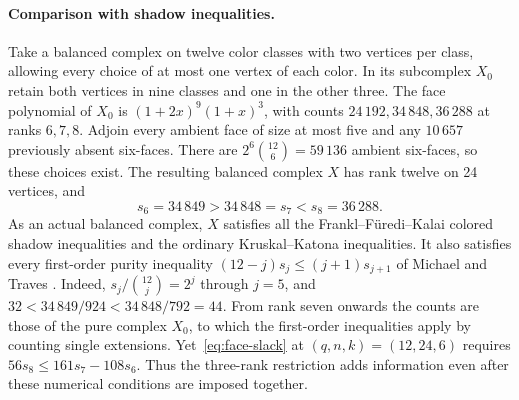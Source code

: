 \documentclass[11pt,a4paper]{article}
\theoremstyle{remark}\newtheorem{remark}[theorem]{Remark}
\numberwithin{equation}{section}
\begin{document}
\paragraph{Comparison with shadow inequalities.}
Take a balanced complex on twelve color classes with two vertices per
class, allowing every choice of at most one vertex of each color. In its
subcomplex $X_0$ retain both vertices in nine classes and one in the other
three. The face polynomial of $X_0$ is $(1+2x)^9(1+x)^3$, with counts
$24\,192,34\,848,36\,288$ at ranks $6,7,8$. Adjoin every ambient face of
size at most five and any $10\,657$ previously absent six-faces. There
are $2^6\binom{12}{6}=59\,136$ ambient six-faces, so these choices exist.
The resulting balanced complex $X$ has rank twelve on 24 vertices, and
\[
                 s_6=34\,849>34\,848=s_7< s_8=36\,288.
\]
As an actual balanced complex, $X$ satisfies all the
Frankl--F\"uredi--Kalai colored shadow inequalities and the ordinary
Kruskal--Katona inequalities. It also satisfies every first-order
purity inequality $(12-j)s_j\le(j+1)s_{j+1}$ of Michael and Traves
\cite{MTroller}. Indeed, $s_j/\binom{12}{j}=2^j$ through $j=5$, and
$32<34\,849/924<34\,848/792=44$. From rank seven onwards the counts
are those of the pure complex $X_0$, to which the first-order inequalities
apply by counting single extensions. Yet~\eqref{eq:face-slack} at
$(q,n,k)=(12,24,6)$ requires $56s_8\le161s_7-108s_6$.
Thus the three-rank restriction adds information even after these numerical
conditions are imposed together.
\end{document}
